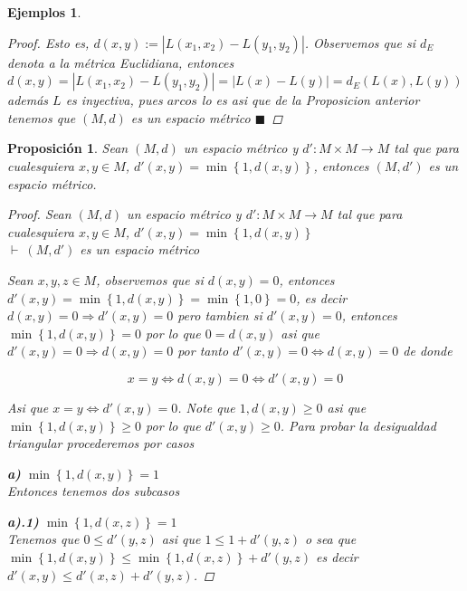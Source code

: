 \documentclass[oneside]{book} %
\theoremstyle{Teorema}
\newtheorem{Proposicion}[Definicion]{Proposición}
\theoremstyle{Ejemplos}
\newtheorem{Ejemplos}[Definicion]{Ejemplos}
\theoremstyle{[Obs]}
\newcommand{\abs}[1]{\left|#1\right|} %
\renewcommand{\{}{\left\lbrace} %
\renewcommand{\}}{\right\rbrace} %
\renewcommand{\qed}{$\blacksquare$} %
\newcommand{\pd}{$\vdash\ $} %
\newcommand{\indentar}[2]{{\setlength{\leftskip}{#1} #2 \setlength{\leftskip}{0cm}}} %
\begin{document}
\begin{Ejemplos}
\begin{proof}
					Esto es, $d(x, y) := \abs{L(x_1, x_2) - L(y_1, y_2)}$. Observemos que si $d_E$ denota a la métrica Euclidiana, entonces $d(x, y) = \abs{L(x_1, x_2) - L(y_1, y_2)} = \abs{L(x) - L(y)} = d_E(L(x), L(y))$ además $L$ es inyectiva, pues $arcos$ lo es asi que de la Proposicion anterior tenemos que $(M, d)$ es un espacio métrico \qed

				\end{proof}
			
			\end{Ejemplos}

			\begin{Proposicion}\setlength{\parindent}{0em}
				
				Sean $(M, d)$ un espacio métrico y $d' : M \times M \to M$ tal que para cualesquiera $x, y \in M$, $d'(x, y) = \min\{ 1, d(x, y) \}$, entonces $(M, d')$ es un espacio métrico.

				\begin{proof}
					
					Sean $(M, d)$ un espacio métrico y $d' : M \times M \to M$ tal que para cualesquiera $x, y \in M$, $d'(x, y) = \min\{ 1, d(x, y) \}$ \\
					\pd $(M, d')$ es un espacio métrico

					Sean $x, y, z \in M$, observemos que si $d(x, y) = 0$, entonces $d'(x, y) = \min\{ 1, d(x, y) \} = \min\{ 1, 0 \} = 0$, es decir $d(x, y) = 0 \Rightarrow d'(x, y) = 0$ pero tambien si $d'(x, y) = 0$, entonces $\min\{ 1, d(x, y) \} = 0$ por lo que $0 = d(x, y)$ asi que $d'(x, y) = 0 \Rightarrow d(x, y) = 0$ por tanto $d'(x, y) = 0 \Leftrightarrow d(x, y) = 0$ de donde 

					\[ x = y \Leftrightarrow d(x, y) = 0 \Leftrightarrow d'(x, y) = 0 \]

					Asi que $x = y \Leftrightarrow d'(x, y) = 0$. Note que $1, d(x, y) \geq 0$ asi que $\min\{ 1, d(x, y) \} \geq 0$ por lo que $d'(x, y) \geq 0$. Para probar la desigualdad triangular procederemos por casos

					\textbf{a)} $\min\{ 1, d(x, y) \} = 1$ \\
					Entonces tenemos dos subcasos

					\indentar{1cm}{
					
						\textbf{a).1)} $\min\{ 1, d(x, z) \} = 1$ \\
						Tenemos que $0 \leq d'(y, z)$ asi que $1 \leq 1 + d'(y, z)$ o sea que $\min\{ 1, d(x, y) \} \leq \min\{ 1, d(x, z) \} + d'(y, z)$ es decir $d'(x, y) \leq d'(x, z) + d'(y, z)$.

}
\end{proof}
\end{Proposicion}
\end{document}
